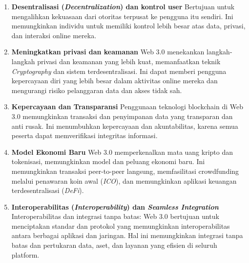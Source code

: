 \documentclass[a4paper]{article}
\begin{document}
\begin{enumerate}
      \item {
            \raggedleft\textbf{Desentralisasi (\textit{Decentralization}) dan kontrol user}
            \linebreak
            \justifying
            Bertujuan untuk mengalihkan kekuasaan dari otoritas terpusat ke
            pengguna itu sendiri. Ini memungkinkan individu untuk memiliki
            kontrol lebih besar atas data, privasi, dan interaksi
            online mereka.
            }

      \item {
            \raggedleft\textbf{Meningkatkan privasi dan keamanan}
            \linebreak
            \justifying
            Web 3.0 menekankan langkah-langkah privasi dan keamanan yang lebih
            kuat, memanfaatkan teknik \textit{Cryptography} dan sistem
            terdesentralisasi. Ini dapat memberi pengguna kepercayaan diri yang
            lebih besar dalam aktivitas online mereka dan mengurangi risiko
            pelanggaran data dan akses tidak sah.
            }

      \item {
            \raggedleft\textbf{Kepercayaan dan Transparansi}
            \linebreak
            \justifying
            Penggunaan teknologi blockchain di Web 3.0 memungkinkan transaksi
            dan penyimpanan data yang transparan dan anti rusak. Ini menumbuhkan
            kepercayaan dan akuntabilitas, karena semua peserta dapat
            memverifikasi integritas informasi.
            }

      \item {
            \raggedleft\textbf{Model Ekonomi Baru}
            \linebreak
            \justifying
            Web 3.0 memperkenalkan mata uang kripto dan tokenisasi, memungkinkan
            model dan peluang ekonomi baru. Ini memungkinkan transaksi
            peer-to-peer langsung, memfasilitasi crowdfunding melalui penawaran
            koin awal (\textit{ICO}), dan memungkinkan aplikasi keuangan
            terdesentralisasi (\textit{DeFi}).
            }

      \item {
            \raggedleft\textbf{Interoperabilitas (\textit{Interoperability}) dan
                  \textit{Seamless Integration}}
            \linebreak
            \justifying
            Interoperabilitas dan integrasi tanpa batas: Web 3.0 bertujuan untuk menciptakan standar dan protokol yang memungkinkan interoperabilitas antara berbagai aplikasi dan jaringan. Hal ini memungkinkan integrasi tanpa batas
            dan pertukaran data, aset, dan layanan yang efisien di seluruh
            platform.
            }
\end{enumerate}
\end{document}
